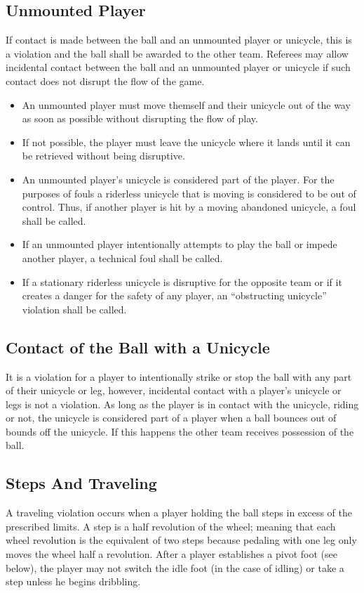 \subsection{Unmounted Player}
If contact is made between the ball and an unmounted player or unicycle, this is a violation and the ball shall be awarded to the other team.
Referees may allow incidental contact between the ball and an unmounted player or unicycle if such contact does not disrupt the flow of the game.
\begin{itemize}
\item An unmounted player must move themself and their unicycle out of the way as soon as possible without disrupting the flow of play.
\item If not possible, the player must leave the unicycle where it lands until it can be retrieved without being disruptive.
\item An unmounted player's unicycle is considered part of the player.
For the purposes of fouls a riderless unicycle that is moving is considered to be out of control.
Thus, if another player is hit by a moving abandoned unicycle, a foul shall be called.
\item If an unmounted player intentionally attempts to play the ball or impede another player, a technical foul shall be called.
\item If a stationary riderless unicycle is disruptive for the opposite team or if it creates a danger for the safety of any player, an ``obstructing unicycle'' violation shall be called.
\end{itemize}

\subsection{Contact of the Ball with a Unicycle}
It is a violation for a player to intentionally strike or stop the ball with any part of their unicycle or leg, however, incidental contact with a player's unicycle or legs is not a violation.
As long as the player is in contact with the unicycle, riding or not, the unicycle is considered part of a player when a ball bounces out of bounds off the unicycle.
If this happens the other team receives possession of the ball.

\subsection{Steps And Traveling}
A traveling violation occurs when a player holding the ball steps in excess of the prescribed limits.
A step is a half revolution of the wheel; meaning that each wheel revolution is the equivalent of two steps because pedaling with one leg only moves the wheel half a revolution.
After a player establishes a pivot foot (see below), the player may not switch the idle foot (in the case of idling) or take a step unless he begins dribbling.

